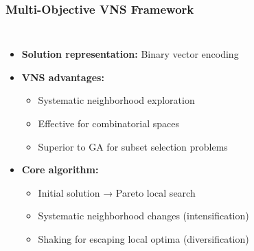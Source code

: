 \documentclass{beamer}
\begin{document}
\begin{frame}
\frametitle{Multi-Objective VNS Framework}

\begin{columns}[T]
\begin{itemize}
\item \textbf{Solution representation:} Binary vector encoding
\item \textbf{VNS advantages:}
  \begin{itemize}
  \item Systematic neighborhood exploration
  \item Effective for combinatorial spaces
  \item Superior to GA for subset selection problems
  \end{itemize}
\item \textbf{Core algorithm:}
  \begin{itemize}
  \item Initial solution → Pareto local search
  \item Systematic neighborhood changes (intensification)
  \item Shaking for escaping local optima (diversification)
  \end{itemize}
\end{itemize}


\end{columns}
\end{frame}
\end{document}
